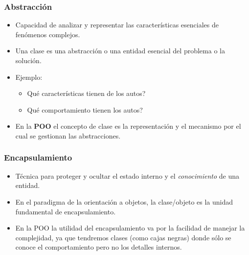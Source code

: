\documentclass{beamer}
\begin{document}
  \begin{frame}
    \frametitle{Abstracción}

    \begin{itemize}
    \item Capacidad de analizar y representar las características
      esenciales de fenómenos complejos.
      
    \item Una clase es una abstracción o una entidad esencial del
      problema o la solución.
      
    \item Ejemplo: 
      \begin{itemize}
      \item[] Qué características tienen de los autos?
      \item[] Qué comportamiento tienen los autos?
      \end{itemize}
      
    \item En la \textbf{POO} el concepto de clase es la representación
      y el mecanismo por el cual se gestionan las abstracciones.
    \end{itemize}

  \end{frame}


  \begin{frame}
    \frametitle{Encapsulamiento}

    \begin{itemize}
      
    \item Técnica para proteger y ocultar el estado interno y el {\em conocimiento} de una entidad.

    \item En el paradigma de la orientación a objetos, la clase/objeto
      es la unidad fundamental de encapsulamiento.
      
    \item En la POO la utilidad del encapsulamiento va por la
      facilidad de manejar la complejidad, ya que tendremos clases
      (como cajas negras) donde sólo se conoce el comportamiento pero
      no los detalles internos.
      
    \end{itemize}
  \end{frame}				
\end{document}
